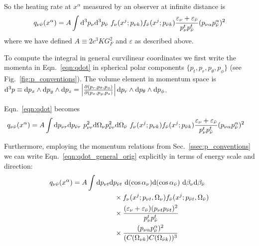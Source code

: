 So the heating rate at $x^\alpha$ measured by an observer at infinite distance is
\begin{equation}
  \label{eqn:qdot}
  q_{\nu \bar{\nu}}(x^\alpha)
  = A \int \mathrm{d}^3p_{\nu} \mathrm{d}^3p_{\bar{\nu}} \,\,
  f_{\nu}(x^j;p_{\nu k})
  f_{\bar{\nu}}(x^j;p_{\bar{\nu} k})
  \frac{  \varepsilon_{\nu}+\varepsilon_{\bar{\nu}}}{p_{\nu}^t p_{\bar{\nu}}^t}
  (p_{\nu \alpha} p_{\bar{\nu}}^\alpha)^2
\end{equation}
where we have defined $A \equiv 2 c^3 K G_F^2$ and $\varepsilon$ as described above.

To compute the integral in general curvilinear coordinates we first write the
momenta in Eqn.~\ref{eqn:qdot} in spherical polar components
$\{p_t,p_r,p_{\theta},p_{\phi}\}$ (see Fig.~\ref{fig:p_conventions}).
The volume element in momentum space is
$\mathrm{d}^3p\equiv\mathrm{d} p_x\wedge\mathrm{d} p_y\wedge\mathrm{d} p_z=\left|\frac{\partial(p_r,p_\theta,p_\phi)}{\partial(p_x,p_y,p_z)}\right|\mathrm{d} p_r\wedge\mathrm{d} p_{\theta}\wedge\mathrm{d} p_{\phi}$.

Eqn.~\ref{eqn:qdot} becomes
\begin{align}
  \label{eqn:qdot_general_orig}
  q_{\nu \bar{\nu}}(x^\alpha)
  &= A \int \mathrm{d} p_{\nu r} \mathrm{d} p_{\bar{\nu} r} \,\,
  p_{\nu r}^2 \mathrm{d}\Omega_{\nu} p_{\bar{\nu} r}^2 \mathrm{d}\Omega_{\bar{\nu}} \,\,
  f_{\nu}(x^j;p_{\nu k}) f_{\bar{\nu}}(x^j;p_{\bar{\nu} k})
  \frac{\varepsilon_{\nu} + \varepsilon_{\bar{\nu}}}{p_{\nu}^t p_{\bar{\nu}}^t}
  (p_{\nu \alpha} p_{\bar{\nu}}^\alpha)^2
\end{align}

Furthermore, employing the momentum relations from Sec.~\ref{ssec:p_conventions}
we can write Eqn.~\ref{eqn:qdot_general_orig} explicitly in terms of energy
scale and direction:
\begin{equation}
  \begin{split}
    \label{eqn:qdot_general}
    q_{\nu \bar{\nu}}(x^\alpha)
    &= A \int \mathrm{d} p_{\nu t} \mathrm{d} p_{\bar{\nu} t} \,\,
    \mathrm{d} (\cos \alpha_{\nu}) \mathrm{d} (\cos \alpha_{\bar{\nu}}) \,\, \mathrm{d} \beta_{\nu} \mathrm{d} \beta_{\bar{\nu}} \\
    & \qquad \qquad \qquad
    \times f_{\nu}(x^j;p_{\nu t},\Omega_{\nu})
    f_{\bar{\nu}}(x^j;p_{\bar{\nu} t},\Omega_{\bar{\nu}}) \\
    & \qquad \qquad \qquad
    \times \frac{(\varepsilon_{\nu} + \varepsilon_{\bar{\nu}})(p_{\nu t} p_{\bar{\nu} t})^2}
           {p_{\nu}^t p_{\bar{\nu}}^t} \\
           & \qquad \qquad \qquad
           \times \frac {(p_{\nu \alpha} p_{\bar{\nu}}^\alpha)^2}
                  {(C(\Omega_{\nu k})C(\Omega_{\bar{\nu} k}))^3}
  \end{split}
\end{equation}

